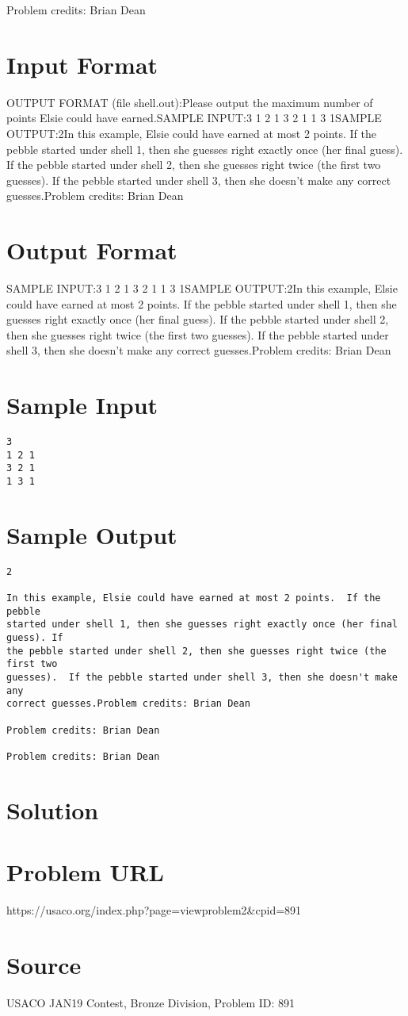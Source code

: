 \documentclass[12pt]{article}
\begin{document}
Problem credits: Brian Dean



\section*{Input Format}
OUTPUT FORMAT (file shell.out):Please output the maximum number of points Elsie could have earned.SAMPLE INPUT:3
1 2 1
3 2 1
1 3 1SAMPLE OUTPUT:2In this example, Elsie could have earned at most 2 points.  If the pebble
started under shell 1, then she guesses right exactly once (her final guess). If
the pebble started under shell 2, then she guesses right twice (the first two
guesses).  If the pebble started under shell 3, then she doesn't make any
correct guesses.Problem credits: Brian Dean

\section*{Output Format}
SAMPLE INPUT:3
1 2 1
3 2 1
1 3 1SAMPLE OUTPUT:2In this example, Elsie could have earned at most 2 points.  If the pebble
started under shell 1, then she guesses right exactly once (her final guess). If
the pebble started under shell 2, then she guesses right twice (the first two
guesses).  If the pebble started under shell 3, then she doesn't make any
correct guesses.Problem credits: Brian Dean

\section*{Sample Input}
\begin{verbatim}
3
1 2 1
3 2 1
1 3 1
\end{verbatim}

\section*{Sample Output}
\begin{verbatim}
2

In this example, Elsie could have earned at most 2 points.  If the pebble
started under shell 1, then she guesses right exactly once (her final guess). If
the pebble started under shell 2, then she guesses right twice (the first two
guesses).  If the pebble started under shell 3, then she doesn't make any
correct guesses.Problem credits: Brian Dean

Problem credits: Brian Dean

Problem credits: Brian Dean
\end{verbatim}

\section*{Solution}


\section*{Problem URL}
https://usaco.org/index.php?page=viewproblem2&cpid=891

\section*{Source}
USACO JAN19 Contest, Bronze Division, Problem ID: 891
\end{document}
